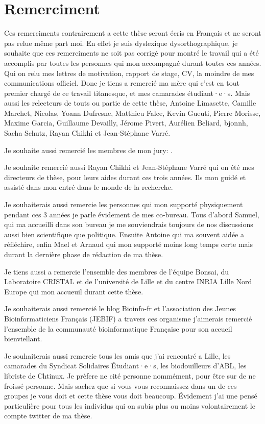 \documentclass[main.tex]{subfiles}
\begin{document}
\section*{Remerciment}
%

Ces remerciments contrairement a cette thèse seront écris en Français et ne seront pas relue même part moi. En effet je suis dyslexique dysorthographique, je souhaite que ces remerciments ne soit pas corrigé pour montré le travail qui a été accomplis par toutes les personnes qui mon accompagné durant toutes ces années. Qui on relu mes lettres de motivation, rapport de stage, CV, la moindre de mes communications officiel. Donc je tiens a remercié ma mère qui c'est en tout premier chargé de ce travail titanesque, et mes camarades étudiant·e·s. Mais aussi les relecteurs de touts ou partie de cette thèse, Antoine Limasette, Camille Marchet, Nicolas, Yoann Dufresne, Matthieu Falce, Kevin Gueuti, Pierre Morisse, Maxime Garcia, Guillaume Devailly, Jérome Pivert, Aurélien Beliard, bjonnh, Sacha Schutz, Rayan Chikhi et Jean-Stéphane Varré.

Je souhaite aussi remercié les membres de mon jury:  .

Je souhaite remercié aussi Rayan Chikhi et Jean-Stéphane Varré qui on été mes directeurs de thèse, pour leurs aides durant ces trois années. Ils mon guidé et assisté dans mon entré dans le monde de la recherche.

Je souhaiterais aussi remercie les personnes qui mon supporté physiquement pendant ces 3 années je parle évidement de mes co-bureau. Tous d'abord Samuel, qui ma accueilli dans son bureau je me souviendrais toujours de nos discussions aussi bien scientifique que politique. Ensuite Antoine qui ma souvent aidée a réfléchire, enfin Mael et Arnaud qui mon supporté moins long temps certe mais durant la dernière phase de rédaction de ma thèse.

Je tiens aussi a remercie l'ensemble des membres de l'équipe Bonsai, du Laboratoire CRISTAL et de l'université de Lille et du centre INRIA Lille Nord Europe qui mon accueuil durant cette thèse.

Je souhaiterais aussi remercié le blog Bioinfo-fr et l'association des Jeunes Bioinformaticiens Français (JEBIF) a travers ces organisme j'aimerais remercié  l'ensemble de la communauté bioinformatique Française pour son accueil bienviellant.

Je souhaiterais aussi remercie tous les amis que j'ai rencontré a Lille, les camarades du Syndicat Solidaires Étudiant·e·s, les biodouilleurs d'ABL, les libriste de Chtinux. Je prèfere ne cité personne nommément, pour être sur de ne froissé personne. Mais sachez que si vous vous reconnaissez dans un de ces groupes je vous doit et cette thèse vous doit beaucoup. Évidement j'ai une pensé particulière pour tous les individus qui on subis plus ou moins volontairement le compte twitter de ma thèse. 
\end{document}
